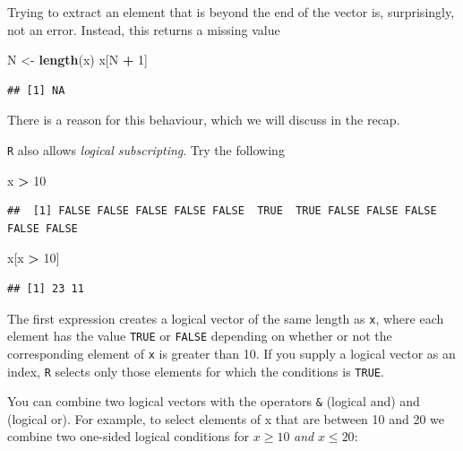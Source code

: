 \documentclass[
]{book}
\newenvironment{Shaded}{\begin{snugshade}}{\end{snugshade}}
\newcommand{\DecValTok}[1]{\textcolor[rgb]{0.00,0.00,0.81}{#1}}
\newcommand{\FunctionTok}[1]{\textcolor[rgb]{0.13,0.29,0.53}{\textbf{#1}}}
\newcommand{\NormalTok}[1]{#1}
\newcommand{\OtherTok}[1]{\textcolor[rgb]{0.56,0.35,0.01}{#1}}
\newcommand{\SpecialCharTok}[1]{\textcolor[rgb]{0.81,0.36,0.00}{\textbf{#1}}}
\begin{document}
Trying to extract an element that is beyond the end of the vector is,
surprisingly, not an error. Instead, this returns a missing value

\begin{Shaded}
\begin{Highlighting}[]
\NormalTok{N }\OtherTok{\textless{}{-}} \FunctionTok{length}\NormalTok{(x)}
\NormalTok{x[N }\SpecialCharTok{+} \DecValTok{1}\NormalTok{]}
\end{Highlighting}
\end{Shaded}

\begin{verbatim}
## [1] NA
\end{verbatim}

There is a reason for this behaviour, which we will discuss in the recap.

\texttt{R} also allows \emph{logical subscripting}. Try the following

\begin{Shaded}
\begin{Highlighting}[]
\NormalTok{x }\SpecialCharTok{\textgreater{}} \DecValTok{10}
\end{Highlighting}
\end{Shaded}

\begin{verbatim}
##  [1] FALSE FALSE FALSE FALSE FALSE  TRUE  TRUE FALSE FALSE FALSE FALSE FALSE
\end{verbatim}

\begin{Shaded}
\begin{Highlighting}[]
\NormalTok{x[x }\SpecialCharTok{\textgreater{}} \DecValTok{10}\NormalTok{]}
\end{Highlighting}
\end{Shaded}

\begin{verbatim}
## [1] 23 11
\end{verbatim}

The first expression creates a logical vector of the same length as
\texttt{x}, where each element has the value \texttt{TRUE} or
\texttt{FALSE} depending on whether or not the corresponding element
of \texttt{x} is greater than 10. If you supply a logical vector as an
index, \texttt{R} selects only those elements for which the conditions is
\texttt{TRUE}.

You can combine two logical vectors with the operators \texttt{\&}
(logical and) and \texttt{\textbar{}} (logical or). For example, to select
elements of x that are between 10 and 20 we combine two one-sided logical
conditions for \(x \geq 10\) \emph{and} \(x \leq 20\):
\end{document}
